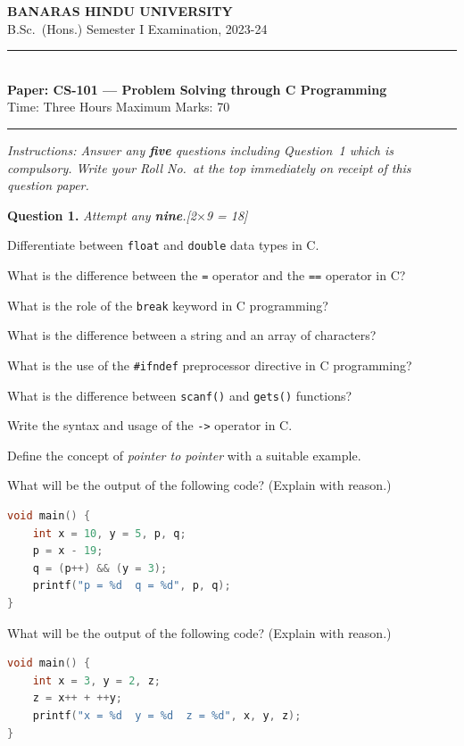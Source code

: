 \documentclass[11pt,a4paper]{article}
\newcommand{\pts}[1]{\hfill   \textit{[#1]}}
\begin{document}
\begin{center}
  {\large\bfseries BANARAS HINDU UNIVERSITY}\\[2pt]
  {\normalsize B.Sc.\ (Hons.) Semester I Examination, 2023-24}\\[6pt]
  \rule{0.8\linewidth}{0.5pt}\\[6pt]
  {\large\bfseries Paper: CS-101 --- Problem Solving through C Programming}\\[4pt]
  {\normalsize Time: Three Hours \hfill Maximum Marks: 70}
\end{center}

\rule{\linewidth}{0.4pt}

\smallskip



\noindent   \textit{Instructions: Answer any   \textbf{five} questions including Question~1 which is compulsory. Write your Roll No.\ at the top immediately on receipt of this question paper.}

\bigskip




\noindent   \textbf{Question 1.}   \textit{Attempt any   \textbf{nine}.}\pts{2$ \times$9 = 18}

\begin{parts}
  \item Differentiate between   \texttt{float} and   \texttt{double} data types in C.
  \item What is the difference between the   \texttt{=} operator and the   \texttt{==} operator in C?
  \item What is the role of the   \texttt{break} keyword in C programming?
  \item What is the difference between a string and an array of characters?
  \item What is the use of the   \texttt{\#ifndef} preprocessor directive in C programming?
  \item What is the difference between   \texttt{scanf()} and   \texttt{gets()} functions?
  \item Write the syntax and usage of the   \texttt{->} operator in C.
  \item Define the concept of \emph{pointer to pointer} with a suitable example.
  \item What will be the output of the following code? (Explain with reason.)

\begin{lstlisting}[language=C]
void main() {
    int x = 10, y = 5, p, q;
    p = x - 19;
    q = (p++) && (y = 3);
    printf("p = %d  q = %d", p, q);
}
\end{lstlisting}
  \item What will be the output of the following code? (Explain with reason.)

\begin{lstlisting}[language=C]
void main() {
    int x = 3, y = 2, z;
    z = x++ + ++y;
    printf("x = %d  y = %d  z = %d", x, y, z);
}
\end{lstlisting}
\end{parts}
\end{document}
